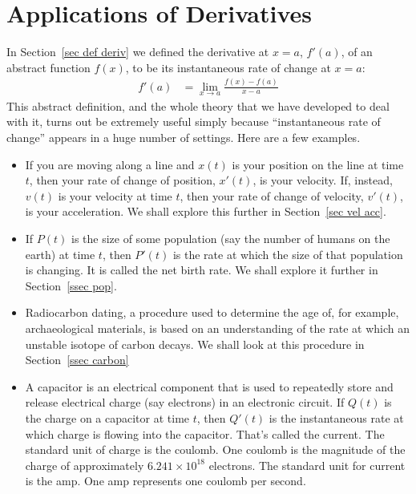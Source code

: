 %
%
\graphicspath{{figures/applications/}}

\chapter{Applications of Derivatives}

In Section~\ref{sec def deriv} we defined the derivative at $x=a$, $f'(a)$, of an
abstract function $f(x)$, to be its instantaneous rate of change at $x=a$:
    \begin{align*}
    f'(a) &= \lim_{x\rightarrow a}\frac{f(x)-f(a)}{x-a}
    \end{align*}
This abstract definition, and the whole theory that we have developed to deal
with it, turns out be extremely useful simply because  ``instantaneous rate of
change'' appears in a huge number of settings. Here are a few examples.
\begin{itemize}
\item  If you are moving along a line and $x(t)$ is your position on the line at
time $t$, then your rate of change of position, $x'(t)$, is your velocity. If,
instead, $v(t)$ is your velocity at time $t$, then your rate of change of
velocity, $v'(t)$, is your acceleration. We shall explore this further in
Section~\ref{sec vel acc}.%


\item If $P(t)$ is the size of some population (say the number of humans on the
earth) at time $t$, then $P'(t)$ is the rate at which the size of that
population is changing. It is called the net birth rate. We shall explore it
further in Section~\ref{ssec pop}.

\item Radiocarbon dating, a procedure used to determine the age of, for example,
archaeological materials, is based on an understanding of the rate at which an unstable
isotope of carbon decays. We shall look at this procedure in Section~\ref{ssec carbon}

\item A capacitor is an electrical component that is used to repeatedly store
and release electrical charge (say electrons) in an electronic circuit. If $Q(t)$ is the
charge on a capacitor at time $t$, then $Q'(t)$ is the instantaneous rate at which charge
is flowing into the capacitor. That's called the current. The standard unit of charge is
the coulomb. One coulomb is the magnitude of the charge of approximately $6.241
\times 10^{18}$ electrons. The standard unit for current is the amp. One amp represents
one coulomb per second.
\end{itemize}


